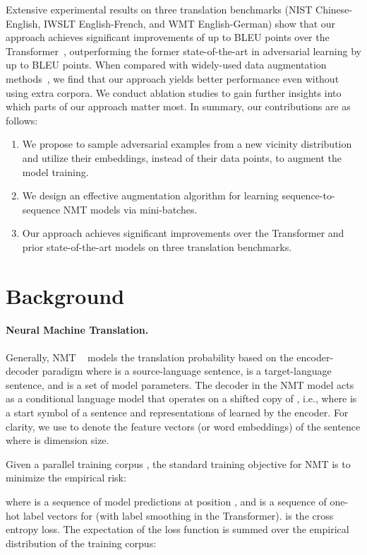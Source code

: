 \documentclass[11pt,a4paper]{article}
\begin{document}
Extensive experimental results on three translation benchmarks (NIST Chinese-English, IWSLT English-French, and WMT English-German) show that our approach achieves significant improvements of up to  BLEU points over the Transformer~\cite{Vaswani:17}, outperforming the former state-of-the-art in adversarial learning \cite{Cheng:19} by up to  BLEU points. When compared with widely-used data augmentation methods~\cite{Sennrich:16b, Edunov:18}, we find that our approach yields better performance even without using extra corpora.
We conduct ablation studies to gain further insights into which parts of our approach matter most. In summary, our contributions are as follows:
\begin{enumerate}
    \item We propose to sample adversarial examples from a new vicinity distribution and utilize their embeddings, instead of their data points, to augment the model training.
    \item We design an effective augmentation algorithm for learning sequence-to-sequence NMT models via mini-batches. 
    \item Our approach achieves significant improvements over the Transformer and prior state-of-the-art models on three translation benchmarks.
\end{enumerate}


\section{Background}

\paragraph{Neural Machine Translation.}
Generally, NMT ~\cite{Bahdanau:15, Gehring:17, Vaswani:17} models the translation probability  based on the encoder-decoder paradigm where  is a source-language sentence,  is a target-language sentence, and  is a set of model parameters. 
The decoder in the NMT model acts as a conditional language model that operates on a shifted copy of , i.e.,  where  is a start symbol of a sentence and representations of  learned by the encoder.
For clarity, we use  to denote the feature vectors (or word embeddings) of the sentence  where  is dimension size.

Given a parallel training corpus , the standard training objective for NMT is to minimize the empirical risk:

where  is a sequence of model predictions  at position , and  is a sequence of one-hot label vectors for  (with label smoothing in the Transformer).  is the cross entropy loss. The expectation of the loss function is summed over the empirical distribution  of the training corpus:
\end{document}
